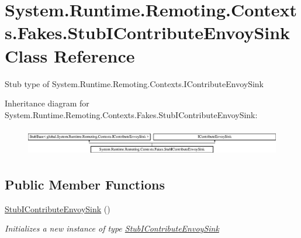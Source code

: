 \hypertarget{class_system_1_1_runtime_1_1_remoting_1_1_contexts_1_1_fakes_1_1_stub_i_contribute_envoy_sink}{\section{System.\-Runtime.\-Remoting.\-Contexts.\-Fakes.\-Stub\-I\-Contribute\-Envoy\-Sink Class Reference}
\label{class_system_1_1_runtime_1_1_remoting_1_1_contexts_1_1_fakes_1_1_stub_i_contribute_envoy_sink}
}


Stub type of System.\-Runtime.\-Remoting.\-Contexts.\-I\-Contribute\-Envoy\-Sink 


Inheritance diagram for System.\-Runtime.\-Remoting.\-Contexts.\-Fakes.\-Stub\-I\-Contribute\-Envoy\-Sink\-:\begin{figure}[H]
\begin{center}
\leavevmode
\includegraphics[height=1.230769cm]{class_system_1_1_runtime_1_1_remoting_1_1_contexts_1_1_fakes_1_1_stub_i_contribute_envoy_sink}
\end{center}
\end{figure}
\subsection*{Public Member Functions}
\begin{DoxyCompactItemize}
\item 
\hyperlink{class_system_1_1_runtime_1_1_remoting_1_1_contexts_1_1_fakes_1_1_stub_i_contribute_envoy_sink_a78ffe0992acc2a07997fa74513e19680}{Stub\-I\-Contribute\-Envoy\-Sink} ()
\begin{DoxyCompactList}\small\item\em Initializes a new instance of type \hyperlink{class_system_1_1_runtime_1_1_remoting_1_1_contexts_1_1_fakes_1_1_stub_i_contribute_envoy_sink}{Stub\-I\-Contribute\-Envoy\-Sink}\end{DoxyCompactList}\end{DoxyCompactItemize}
